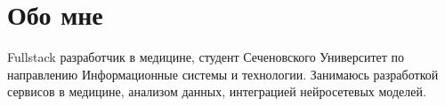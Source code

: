 \section{Обо мне}
{Fullstack разработчик в медицине, студент Сеченовского Университет по направлению Информационные системы и технологии. Занимаюсь разработкой сервисов в медицине, анализом данных, интеграцией нейросетевых моделей.}
